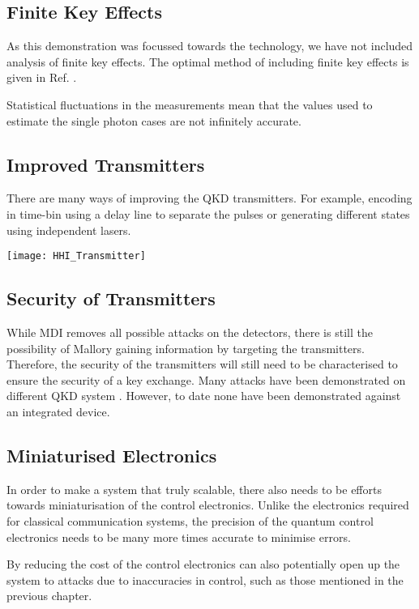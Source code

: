 \subsection{Finite Key Effects}

As this demonstration was focussed towards the technology, we have not included analysis of finite key effects. The optimal method of including finite key effects is given in Ref. \cite{zhou2016}.

Statistical fluctuations in the measurements mean that the values used to estimate the single photon cases are not infinitely accurate. 

\subsection{Improved Transmitters}

There are many ways of improving the QKD transmitters. For example, encoding in time-bin using a delay line to separate the pulses or generating different states using independent lasers.

\begin{sidewaysfigure}
	\centering
	\texttt{[image: HHI\_Transmitter]}
	\caption[Latest generation InP QKD Transmitter]{Latest generation HHI indium phosphide transmitter. The \SI[product-units=power]{6x4}{mm} chip contains a few ways to create BB84 states for QKD. Firstly, we have designs to compare \ac{dfb} and \ac{DBR} lasers. Secondly, we can use a delay line to separate the time bins. Finally, we have multiplexed lasers to pulse independently lasers for each state.}
\end{sidewaysfigure}

\subsection{Security of Transmitters}

While \ac{MDI} removes all possible attacks on the detectors, there is still the possibility of Mallory gaining information by targeting the transmitters. Therefore, the security of the transmitters will still need to be characterised to ensure the security of a key exchange. Many attacks have been demonstrated on different \ac{QKD} system \cite{makarov2019}. However, to date none have been demonstrated against an integrated device.

\subsection{Miniaturised Electronics}

In order to make a system that truly scalable, there also needs to be efforts towards miniaturisation of the control electronics. Unlike the electronics required for classical communication systems, the precision of the quantum control electronics needs to be many more times accurate to minimise errors.

By reducing the cost of the control electronics can also potentially open up the system to attacks due to inaccuracies in control, such as those mentioned in the previous chapter. 

